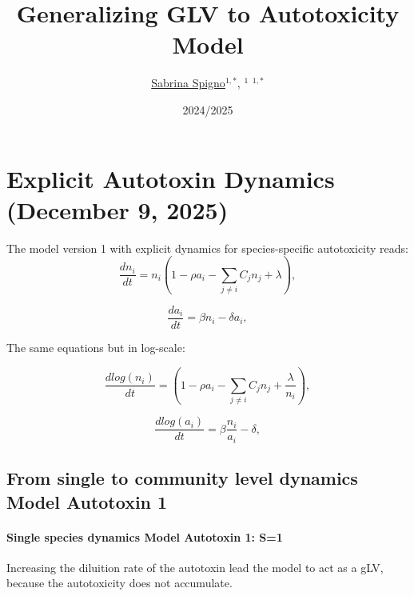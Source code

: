 \documentclass[11pt,a4paper,fleqn]{scrartcl}
\begin{document}
\title{Generalizing GLV to Autotoxicity Model}

\author{
	\small{%
		\href{https://orcid.org/}{Sabrina Spigno}\(^{1, *}\),
		\href{https://orcid.org/}{}\(^1\)
		\href{}{}\(^{1, *}\)
	}
}
\date{2024/2025}
\maketitle  

\section{Explicit Autotoxin Dynamics (December 9, 2025)}
The model version 1 with explicit dynamics for species-specific autotoxicity reads:
\begin{equation}
\frac{dn_i}{dt} = n_i \left(1 - \rho a_i - \sum_{j \neq i} C_{j} n_j + \lambda \right), \label{eq:model1}
\end{equation}

\begin{equation}
\frac{da_i}{dt} = \beta n_i - \delta a_i, \label{eq:model2}
\end{equation}

The same equations but in log-scale:

\begin{equation}
\frac{dlog(n_i)}{dt} =  \left(1 - \rho a_i - \sum_{j \neq i} C_{j} n_j + \frac{\lambda}{n_i} \right), \label{eq:modellog1}
\end{equation}

\begin{equation}
\frac{dlog(a_i)}{dt} = \beta\frac{n_i}{a_i} - \delta , \label{eq:modellog2}
\end{equation}
\clearpage

\subsection{From single to community level dynamics Model Autotoxin 1}

\paragraph{Single species dynamics Model Autotoxin 1: S=1}
Increasing the diluition rate of the autotoxin lead the model to act as a gLV, because the autotoxicity does not accumulate.
\end{document}
